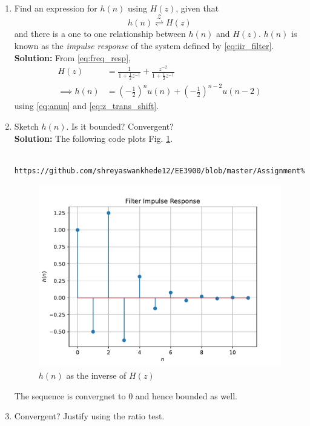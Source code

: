 \documentclass[journal,12pt,twocolumn]{IEEEtran}
\newcommand{\solution}{\noindent \textbf{Solution: }}
\providecommand{\brak}[1]{\ensuremath{\left(#1\right)}}
\providecommand{\ztrans}{\overset{\mathcal{Z}}{ \rightleftharpoons}}
\numberwithin{equation}{section}
\renewcommand\thesection{\arabic{section}}
\renewcommand\thesection{\arabic{section}}
\begin{document}
\begin{enumerate}[label=\thesection.\arabic*]
\item \label{prob:impulse_resp}
Find an expression for $h(n)$ using $H(z)$, given that 
\begin{equation}
\label{eq:impulse_resp}
h(n) \ztrans H(z)
\end{equation}
and there is a one to one relationship between $h(n)$ and $H(z)$. $h(n)$ is known as the {\em impulse response} of the
system defined by \eqref{eq:iir_filter}.
\\
\solution From \eqref{eq:freq_resp},
\begin{align}
H(z) &= \frac{1}{1 + \frac{1}{2}z^{-1}} + \frac{ z^{-2}}{1 + \frac{1}{2}z^{-1}}
\\
\implies h(n) &= \brak{-\frac{1}{2}}^{n}u(n) + \brak{-\frac{1}{2}}^{n-2}u(n-2)
\end{align}
using \eqref{eq:anun} and \eqref{eq:z_trans_shift}.
\item Sketch $h(n)$. Is it bounded? Convergent? 
\\
\solution The following code plots Fig. \ref{fig:hn}.
\begin{lstlisting}
	https://github.com/shreyaswankhede12/EE3900/blob/master/Assignment%201/codes/qs%205/hn.py
\end{lstlisting}
\begin{figure}[!ht]
\centering
\includegraphics[width=\columnwidth]{figs/5.2 hn}
\caption{$h(n)$ as the inverse of $H(z)$}
\label{fig:hn}
\end{figure}
The sequence is convergnet to $0$ and hence bounded as well.
%
\item Convergent? Justify using the ratio test.\\

\end{enumerate}
\end{document}
